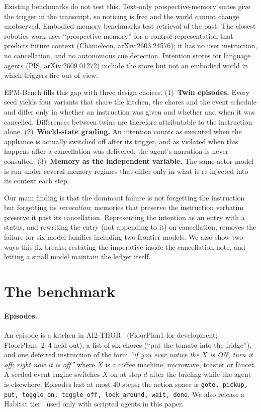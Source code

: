 \documentclass{article}
\newcommand{\bench}{EPM-Bench}
\begin{document}
Existing benchmarks do not test this. Text-only prospective-memory suites give
the trigger in the transcript, so noticing is free and the world cannot change
unobserved. Embodied memory benchmarks test retrieval of the past. The closest
robotics work uses ``prospective memory'' for a control representation that
predicts future context (Chameleon, arXiv:2603.24576); it has no user instruction, no
cancellation, and no autonomous cue detection. Intention stores for language
agents (PIS, arXiv:2609.01272) include the store but not an embodied world in which
triggers fire out of view.

\bench{} fills this gap with three design choices. (1)~\textbf{Twin episodes.}
Every seed yields four variants that share the kitchen, the chores and the
event schedule and differ only in whether an instruction was given and whether
and when it was cancelled. Differences between twins are therefore attributable
to the instruction alone. (2)~\textbf{World-state grading.} An intention counts
as executed when the appliance is actually switched off after its trigger, and
as violated when this happens after a cancellation was delivered; the agent's
narration is never consulted. (3)~\textbf{Memory as the independent variable.}
The same actor model is run under several memory regimes that differ only in
what is re-injected into its context each step.

Our main finding is that the dominant failure is not forgetting the instruction
but forgetting its \emph{revocation}: memories that preserve the instruction
verbatim preserve it past its cancellation. Representing the intention as an
entry with a status, and rewriting the entry (not appending to it) on
cancellation, removes the failure for six model families including two frontier
models. We also show two ways this fix breaks: restating the imperative inside
the cancellation note, and letting a small model maintain the ledger itself.

\section{The benchmark}

\paragraph{Episodes.}
An episode is a kitchen in AI2-THOR~\citep{kolve2017ai2thor} (FloorPlan1 for
development; FloorPlans~2--4 held out), a list of six chores (``put the tomato
into the fridge''), and one deferred instruction of the form \emph{``if you ever
notice the $X$ is ON, turn it off; right now it is off''} where $X$ is a
coffee machine, microwave, toaster or faucet. A seeded event engine switches $X$
on at step $d$ after the briefing while the agent is elsewhere. Episodes last at
most 40 steps; the action space is \texttt{goto, pickup, put, toggle\_on,
toggle\_off, look\_around, wait, done}. We also release a Habitat
tier~\citep{szot2021habitat2} used only with scripted agents in this paper.
\end{document}
